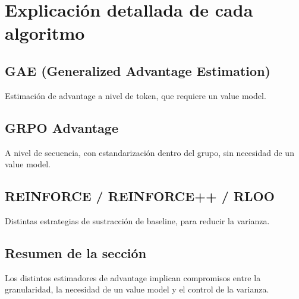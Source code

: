 \section{Explicación detallada de cada algoritmo}
\subsection{GAE (Generalized Advantage Estimation)}
Estimación de advantage a nivel de token, que requiere un value model.

\subsection{GRPO Advantage}
A nivel de secuencia, con estandarización dentro del grupo, sin necesidad de un value model.

\subsection{REINFORCE / REINFORCE++ / RLOO}
Distintas estrategias de sustracción de baseline, para reducir la varianza.

\subsection{Resumen de la sección}
Los distintos estimadores de advantage implican compromisos entre la granularidad, la necesidad de un value model y el control de la varianza.

\newpage
